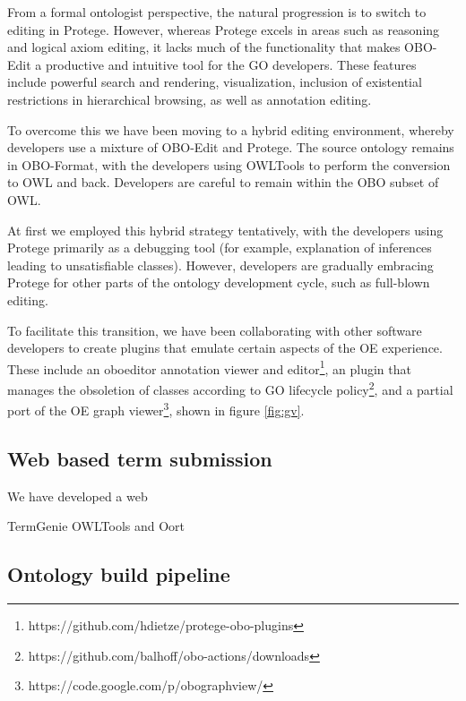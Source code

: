 \documentclass{llncs}
\begin{document}
From a formal ontologist perspective, the natural progression is to
switch to editing in Protege. However, whereas Protege excels in areas
such as reasoning and logical axiom editing, it lacks much of the
functionality that makes OBO-Edit a productive and intuitive tool for
the GO developers. These features include powerful search and
rendering, visualization, inclusion of existential restrictions in
hierarchical browsing, as well as annotation editing.

To overcome this we have been moving to a hybrid editing environment,
whereby developers use a mixture of OBO-Edit and Protege. The source
ontology remains in OBO-Format, with the developers using
OWLTools\cite{OWLTools} to perform the conversion to OWL and
back. Developers are careful to remain within the OBO subset of OWL.

At first we employed this hybrid strategy tentatively, with the
developers using Protege primarily as a debugging tool (for example,
explanation of inferences leading to unsatisfiable classes). However,
developers are gradually embracing Protege for other parts of the
ontology development cycle, such as full-blown editing.

To facilitate this transition, we have been collaborating with other
software developers to create plugins that emulate certain aspects of
the OE experience. These include an oboeditor annotation viewer and
editor\footnote{https://github.com/hdietze/protege-obo-plugins}, an
plugin that manages the obsoletion of classes according to GO
lifecycle policy\footnote{https://github.com/balhoff/obo-actions/downloads}, and a partial
port of the OE graph
viewer\footnote{https://code.google.com/p/obographview/}, shown in figure
\ref{fig:gv}.

\subsection{Web based term submission}

We have developed a web

TermGenie\cite{Dietze2014}
OWLTools and Oort

\subsection{Ontology build pipeline}
\end{document}
